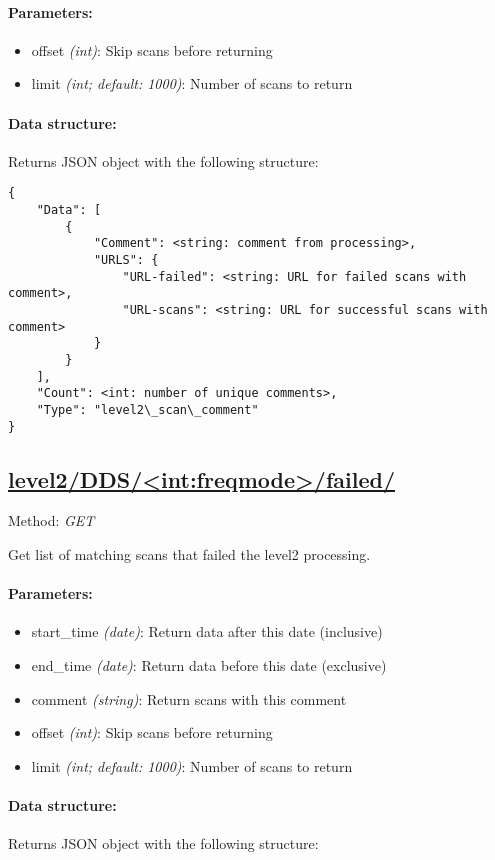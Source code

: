\paragraph{Parameters:}
\begin{itemize}
	\item offset \emph{(int)}: Skip scans before returning
	\item limit \emph{(int; default: 1000)}: Number of scans to return
\end{itemize}

\paragraph{Data structure:}
Returns JSON object with the following structure:

\begin{lstlisting}
{
	"Data": [
		{
			"Comment": <string: comment from processing>,
			"URLS": {
				"URL-failed": <string: URL for failed scans with comment>,
				"URL-scans": <string: URL for successful scans with comment>
			}
		}
	],
	"Count": <int: number of unique comments>,
	"Type": "level2\_scan\_comment"
}
\end{lstlisting}


\subsection{\url{level2/DDS/<int:freqmode>/failed/}}
Method: \emph{GET}

Get list of matching scans that failed the level2 processing.

\paragraph{Parameters:}
\begin{itemize}
    \item start\_time \emph{(date)}: Return data after this date (inclusive)
    \item end\_time \emph{(date)}: Return data before this date (exclusive)
	\item comment \emph{(string)}: Return scans with this comment
	\item offset \emph{(int)}: Skip scans before returning
	\item limit \emph{(int; default: 1000)}: Number of scans to return
\end{itemize}

\paragraph{Data structure:}
Returns JSON object with the following structure:


